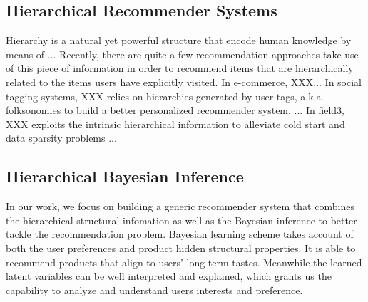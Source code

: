 \subsection{Hierarchical Recommender Systems}
Hierarchy is a natural yet powerful structure that encode human knowledge by means of ... Recently, there are quite a few recommendation approaches take use of this piece of information in order to recommend items that are hierarchically related to the items users have explicitly visited.  In e-commerce, XXX...   In social tagging systems, XXX relies on hierarchies generated by user tags, a.k.a folksonomies to build a better personalized recommender system. ...  In field3, XXX exploits the intrinsic hierarchical information to alleviate cold start and data sparsity problems ...

\subsection{Hierarchical Bayesian Inference}
In our work, we focus on building a generic recommender system that combines the hierarchical structural infomation as well as the Bayesian inference to better tackle the recommendation problem.  Bayesian learning scheme takes account of both the user preferences and product hidden structural properties. It is able to recommend products that align to users' long term tastes. Meanwhile the learned latent variables can be well interpreted and explained, which grants us the capability to analyze and understand users interests and preference.

